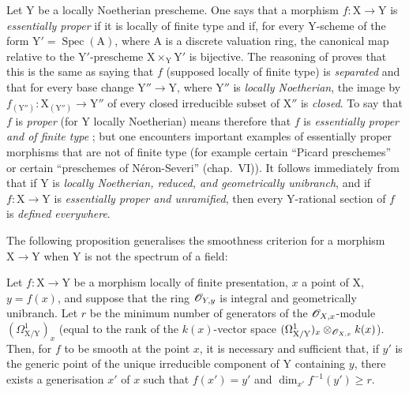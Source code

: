 \begin{remark}[18.10.20]
\label{IV.18.10.20}
Let $\mathrm{Y}$ be a locally Noetherian prescheme.
One says that a morphism $f:\mathrm{X}\to\mathrm{Y}$ is \emph{essentially proper} if it is locally of finite type and if, for every $\mathrm{Y}$-scheme of the form $\mathrm{Y}'=\operatorname{Spec}(\mathrm{A})$, where $\mathrm{A}$ is a discrete valuation ring, the canonical map  relative to the $\mathrm{Y}'$-prescheme $\mathrm{X}\times_{\mathrm{Y}}\mathrm{Y}'$ is bijective.
The reasoning of  proves that this is the same as saying that $f$ (supposed locally of finite type) is \emph{separated} and that for every base change $\mathrm{Y}''\to\mathrm{Y}$, where $\mathrm{Y}''$ is \emph{locally Noetherian}, the image by $f_{(\mathrm{Y}'')}: \mathrm{X}_{(\mathrm{Y}'')}\to\mathrm{Y}''$ of every closed irreducible subset of $\mathrm{X}''$ is \emph{closed}.
To say that $f$ is \emph{proper} (for $\mathrm{Y}$ locally Noetherian) means therefore that $f$ is \emph{essentially proper and of finite type} ; but one encounters important examples of essentially proper morphisms that are not of finite type (for example certain ``Picard preschemes'' or certain ``preschemes of N\'eron-Severi'' (chap.~VI)).
It follows immediately from  that if $\mathrm{Y}$ is \emph{locally Noetherian, reduced, and geometrically unibranch}, and if $f:\mathrm{X}\to\mathrm{Y}$ is \emph{essentially proper and unramified}, then every $\mathrm{Y}$-rational section of $f$ is \emph{defined everywhere}.
\end{remark}

The following proposition generalises the smoothness criterion  for a morphism $\mathrm{X}\to\mathrm{Y}$ when $\mathrm{Y}$ is not the spectrum of a field:

\begin{proposition}[18.10.21]
\label{IV.18.10.21}
Let $f:\mathrm{X}\to\mathrm{Y}$ be a morphism locally of finite presentation, $x$ a point of $\mathrm{X}$, $y=f(x)$, and suppose that the ring $\mathscr{O}_{Y,y}$ is integral and geometrically unibranch.
Let $r$ be the minimum number of generators of the $\mathscr{O}_{X,x}$-module $(\Omega^1_{\mathrm{X}/\mathrm{Y}})_x$ (equal to the rank of the $k(x)$-vector space $(\Omega^1_{\mathrm{X}/\mathrm{Y}})_x\otimes_{\mathscr{O}_{X,x}}k(x)$).
Then, for $f$ to be smooth at the point $x$, it is necessary and sufficient that, if $y'$ is the generic point of the unique irreducible component of $\mathrm{Y}$ containing $y$, there exists a generisation $x'$ of $x$ such that $f(x')=y'$ and $\dim_{x'}f^{-1}(y')\geq r$.
\end{proposition}

